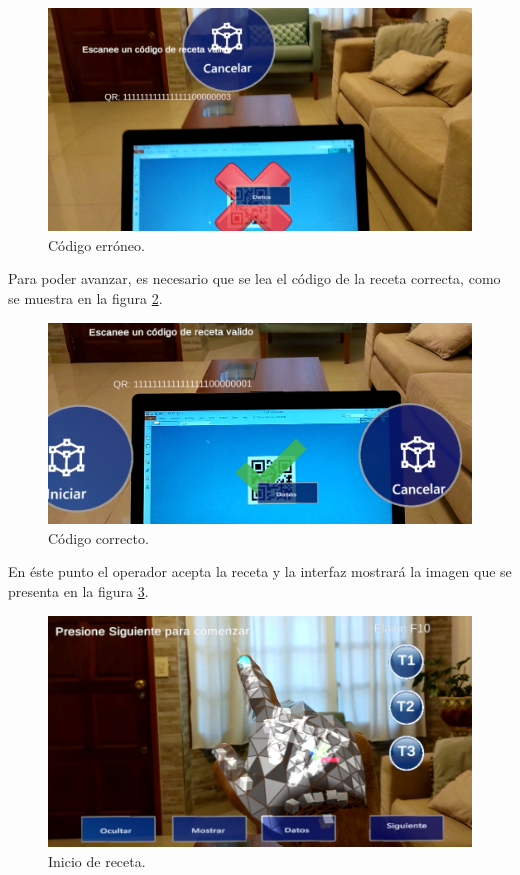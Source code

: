 \begin{figure}[!htpb]
	\centering
	\includegraphics[scale=.3]{./Figures/i3.PNG}
	\caption{Código erróneo\protect\footnotemark.}
	\label{fig:i3}
\end{figure}

Para poder avanzar, es necesario que se lea el código de la receta correcta, como se muestra en la figura \ref{fig:i4}.

\begin{figure}[!htpb]
	\centering
	\includegraphics[scale=.4]{./Figures/i4.PNG}
	\caption{Código correcto\protect\footnotemark.}
	\label{fig:i4}
\end{figure}

En éste punto el operador acepta la receta y la interfaz mostrará la imagen que se presenta en la figura \ref{fig:i6}.

\begin{figure}[!htpb]
	\centering
	\includegraphics[scale=.4]{./Figures/i6.PNG}
	\caption{Inicio de receta\protect\footnotemark.}
	\label{fig:i6}
\end{figure}

